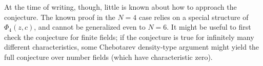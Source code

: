 At the time of writing, though, little is known about how to approach
the conjecture. The known proof in the $N = 4$ case relies on a
special structure of $\Phi_4(z, c)$, and cannot be generalized even to
$N = 6$. It might be useful to first check the conjecture for finite
fields; if the conjecture is true for infinitely many different
characteristics, some Chebotarev density-type argument might yield the
full conjecture over number fields (which have characteristic zero).


